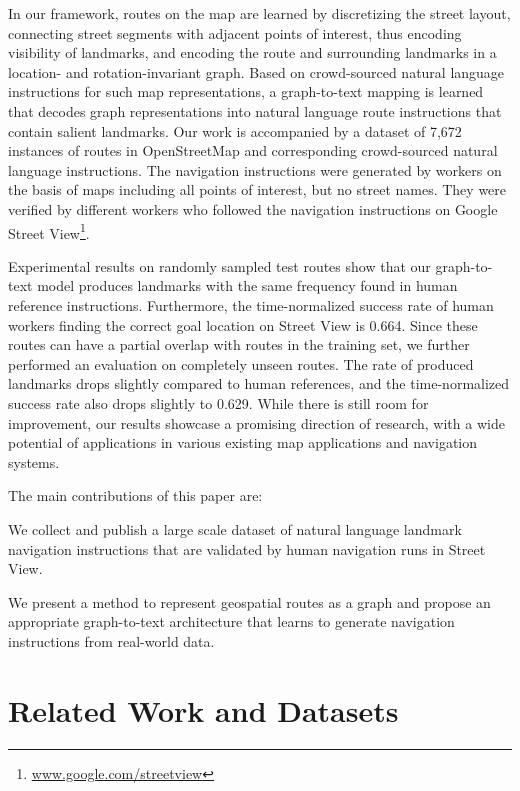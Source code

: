 \documentclass[11pt,a4paper]{article}
\begin{document}
In our framework, routes on the map are learned by discretizing the street layout, connecting street segments with adjacent points of interest, thus encoding visibility of landmarks, and encoding the route and surrounding landmarks in a location- and rotation-invariant graph. Based on crowd-sourced natural language instructions for such map representations, a graph-to-text mapping is learned that decodes graph representations into natural language route instructions that contain salient landmarks.
Our work is accompanied by a dataset of 7,672 instances of routes in OpenStreetMap and corresponding crowd-sourced natural language instructions. The navigation instructions were generated by workers on the basis of maps including all points of interest, but no street names. They were verified by different workers who followed the navigation instructions on Google Street View\footnote{\url{www.google.com/streetview}}.

Experimental results on randomly sampled test routes show that our graph-to-text model produces landmarks with the same frequency found in human reference instructions. Furthermore, the time-normalized success rate of human workers finding the correct goal location on Street View is 0.664. Since these routes can have a partial overlap with routes in the training set, we further performed an evaluation on completely unseen routes. The rate of produced landmarks drops slightly compared to human references, and the time-normalized success rate also drops slightly to 0.629. While there is still room for improvement, our results showcase a promising direction of research, with a wide potential of applications in various existing map applications and navigation systems.


The main contributions of this paper are:
\begin{compactitem}[]
\item We collect and publish a large scale dataset of natural language landmark navigation instructions that are validated by human navigation runs in Street View.
\item We present a method to represent geospatial routes as a graph and propose an appropriate graph-to-text architecture that learns to generate navigation instructions from real-world data.
\end{compactitem}

\section{Related Work and Datasets}
\end{document}
